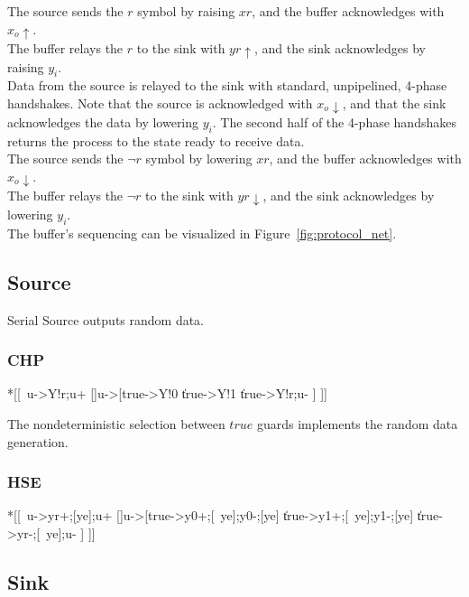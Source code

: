 \documentclass{article}
\begin{document}
\noindent
The source sends the $r$ symbol by raising $xr$, and the buffer
acknowledges with $x_o\uparrow$. \\
The buffer relays the $r$ to the sink with $yr\uparrow$, and the
sink acknowledges by raising $y_i$. \\
Data from the source is relayed to the sink with standard, unpipelined,
4-phase handshakes. Note that the source is acknowledged with $x_o\downarrow$, 
and that the sink acknowledges the data by lowering $y_i$. 
The second half of the 4-phase handshakes returns the process to the state 
ready to receive data. \\
The source sends the $\neg r$ symbol by lowering $xr$, and the buffer
acknowledges with $x_o\downarrow$. \\
The buffer relays the $\neg r$ to the sink with $yr\downarrow$, and the
sink acknowledges by lowering $y_i$. \\

\noindent
The buffer's sequencing can be visualized in Figure~\ref{fig:protocol_net}.

\subsection{Source}

Serial Source outputs random data.

\subsubsection*{CHP}

\begin{csp}
*[[~u->Y!r;u+
  []u->[true->Y!0
         \|true->Y!1
         \|true->Y!\neg r;u-
         ]
 ]]
\end{csp}

\noindent
The nondeterministic selection between $true$ guards implements the random
data generation.

\subsubsection*{HSE}

\begin{hse}
*[[~u->yr+;[ye];u+
  []u->[true->y0+;[~ye];y0-;[ye]
         \|true->y1+;[~ye];y1-;[ye]
         \|true->yr-;[~ye];u-
         ]
 ]]
\end{hse}

\subsection{Sink}
\end{document}
